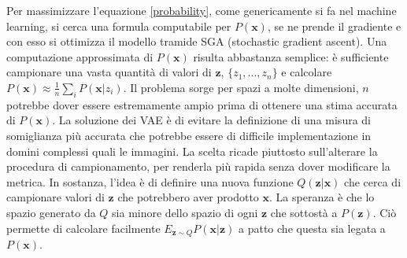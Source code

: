 Per massimizzare l'equazione \ref{probability}, come genericamente si fa nel machine learning, si cerca una formula computabile per $P(\boldsymbol{x})$, se ne prende il gradiente e con esso si ottimizza il modello tramide SGA (stochastic gradient ascent). Una computazione approssimata di $P(\boldsymbol{x})$ risulta abbastanza semplice: è sufficiente campionare una vasta quantità di valori di $\boldsymbol{z}$, $\{z_1,...,z_n\}$ e calcolare $P(\boldsymbol{x}) \approx \frac{1}{n} \sum_i P(\boldsymbol{x} | z_i)$. Il problema sorge per spazi a molte dimensioni, $n$ potrebbe dover essere estremamente ampio prima di ottenere una stima accurata di $P(\boldsymbol{x})$. La soluzione dei VAE è di evitare la definizione di una misura di somiglianza più accurata che potrebbe essere di difficile implementazione in domini complessi quali le immagini. La scelta ricade piuttosto sull'alterare la procedura di campionamento, per renderla più rapida senza dover modificare la metrica. In sostanza, l'idea è di definire una nuova funzione $Q(\boldsymbol{z} | \boldsymbol{x})$ che cerca di campionare valori di $\boldsymbol{z}$ che potrebbero aver prodotto $\boldsymbol{x}$. La speranza è che lo spazio generato da $Q$ sia minore dello spazio di ogni $\boldsymbol{z}$ che sottostà a $P(\boldsymbol{z})$. Ciò permette di calcolare facilmente $E_{\boldsymbol{z}\sim Q} P(\boldsymbol{x} | \boldsymbol{z})$ a patto che questa sia legata a $P(\boldsymbol{x})$.

